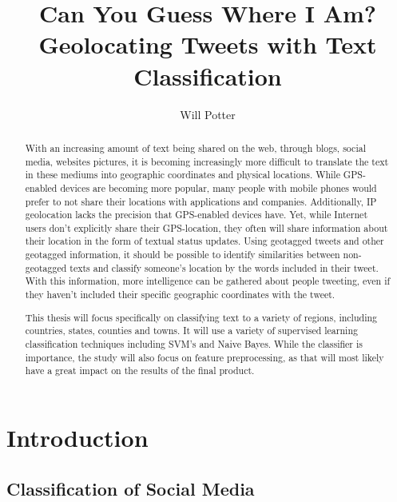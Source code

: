 \documentclass[midd]{thesis}
\title {Can You Guess Where I Am?\\ Geolocating Tweets with Text Classification}
\author {Will Potter}
\begin{document}
\maketitle

\begin{abstract}
With an increasing amount of text being shared on the web, through blogs, social media, websites pictures, it is becoming increasingly more difficult to translate the text in these mediums into geographic coordinates and physical locations. While GPS-enabled devices are becoming more popular, many people with mobile phones would prefer to not share their locations with applications and companies. Additionally, IP geolocation lacks the precision that GPS-enabled devices have. Yet, while Internet users don't explicitly share their GPS-location, they often will share information about their location in the form of textual status updates. Using geotagged tweets and other geotagged information, it should be possible to identify similarities between non-geotagged texts and classify someone's location by the words included in their tweet. With this information, more intelligence can be gathered about people tweeting, even if they haven't included their specific geographic coordinates with the tweet.

This thesis will focus specifically on classifying text to a variety of regions, including countries, states, counties and towns. It will use a variety of supervised learning classification techniques including SVM's and Naive Bayes. While the classifier is importance, the study will also focus on feature preprocessing, as that will most likely have a great impact on the results of the final product.
\end{abstract}

\begin{acknowledgements}
% 
\end{acknowledgements}

\contentspage
\tablelistpage
\figurelistpage

\normalspacing \setcounter{page}{1} 

\chapter{Introduction}

\section{Classification of Social Media}
\end{document}
